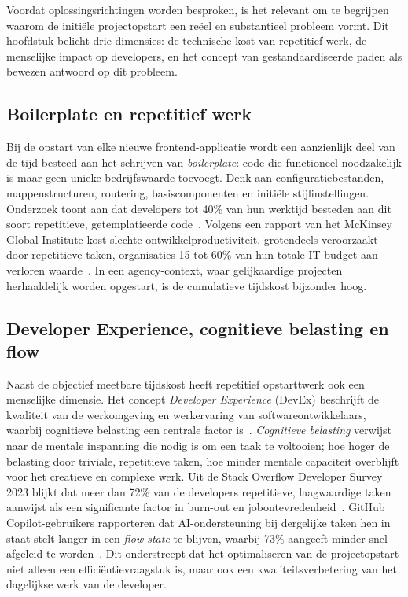Voordat oplossingsrichtingen worden besproken, is het relevant om te begrijpen waarom de initiële projectopstart een reëel en substantieel probleem vormt. Dit hoofdstuk belicht drie dimensies: de technische kost van repetitief werk, de menselijke impact op developers, en het concept van gestandaardiseerde paden als bewezen antwoord op dit probleem.

\subsection{Boilerplate en repetitief werk}
\label{subsec:boilerplate}

Bij de opstart van elke nieuwe frontend-applicatie wordt een aanzienlijk deel van de tijd besteed aan het schrijven van \textit{boilerplate}: code die functioneel noodzakelijk is maar geen unieke bedrijfswaarde toevoegt. Denk aan configuratiebestanden, mappenstructuren, routering, basiscomponenten en initiële stijlinstellingen. Onderzoek toont aan dat developers tot 40\% van hun werktijd besteden aan dit soort repetitieve, getemplatieerde code~\autocite{StackOverflow2024}. Volgens een rapport van het McKinsey Global Institute kost slechte ontwikkelproductiviteit, grotendeels veroorzaakt door repetitieve taken, organisaties 15 tot 60\% van hun totale IT-budget aan verloren waarde~\autocite{McKinseyDev2023}. In een agency-context, waar gelijkaardige projecten herhaaldelijk worden opgestart, is de cumulatieve tijdskost bijzonder hoog.

\subsection{Developer Experience, cognitieve belasting en flow}
\label{subsec:devex-cognitieve-belasting}

Naast de objectief meetbare tijdskost heeft repetitief opstarttwerk ook een menselijke dimensie. Het concept \textit{Developer Experience} (DevEx) beschrijft de kwaliteit van de werkomgeving en werkervaring van softwareontwikkelaars, waarbij cognitieve belasting een centrale factor is~\autocite{Augment2025}. \textit{Cognitieve belasting} verwijst naar de mentale inspanning die nodig is om een taak te voltooien; hoe hoger de belasting door triviale, repetitieve taken, hoe minder mentale capaciteit overblijft voor het creatieve en complexe werk. Uit de Stack Overflow Developer Survey 2023 blijkt dat meer dan 72\% van de developers repetitieve, laagwaardige taken aanwijst als een significante factor in burn-out en jobontevredenheid~\autocite{StackOverflow2023}. GitHub Copilot-gebruikers rapporteren dat AI-ondersteuning bij dergelijke taken hen in staat stelt langer in een \textit{flow state} te blijven, waarbij 73\% aangeeft minder snel afgeleid te worden~\autocite{GitHubCopilotSurvey2022}. Dit onderstreept dat het optimaliseren van de projectopstart niet alleen een efficiëntievraagstuk is, maar ook een kwaliteitsverbetering van het dagelijkse werk van de developer.

